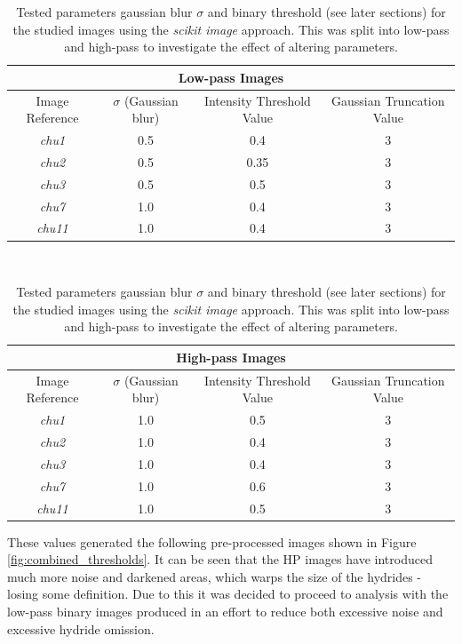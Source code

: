 \documentclass{article}
\begin{document}
	\begin{table}[ht]
	\begin{center}
	\begin{tabular}{ |c|c|c|c| } 
		\hline
		\multicolumn{4}{|c|}{Low-pass Images} \\
		\hline
		Image Reference & $\sigma$ (Gaussian blur) & Intensity Threshold Value & Gaussian Truncation Value \\
		\hline
		\textit{chu1} & 0.5 & 0.4 & 3 \\ 
		\textit{chu2} & 0.5 & 0.35 & 3 \\ 
		\textit{chu3} & 0.5 & 0.5 & 3 \\ 
		\textit{chu7} & 1.0 & 0.4 & 3 \\ 
		\textit{chu11} & 1.0 & 0.4 & 3 \\ 
		\hline
	\end{tabular}
	\\
	\begin{tabular}{ |c|c|c|c| } 
		\hline
		\multicolumn{4}{|c|}{High-pass Images} \\
		\hline
		Image Reference & $\sigma$ (Gaussian blur) & Intensity Threshold Value & Gaussian Truncation Value \\
		\hline
		\textit{chu1} & 1.0 & 0.5 & 3 \\ 
		\textit{chu2} & 1.0 & 0.4 & 3 \\ 
		\textit{chu3} & 1.0 & 0.4 & 3 \\ 
		\textit{chu7} & 1.0 & 0.6 & 3 \\ 
		\textit{chu11} & 1.0 & 0.5 & 3 \\ 
		\hline
	\end{tabular}
	\caption{Tested parameters gaussian blur $\sigma$ and binary threshold (see later sections) for the studied images using the \textit{scikit image} approach. This was split into low-pass and high-pass to investigate the effect of altering parameters.}
	\label{tab:imageprocessing}
	\end{center}
	\end{table}
	
    \noindent These values generated the following pre-processed images shown in Figure \ref{fig:combined_thresholds}. It can be seen that the HP images have introduced much more noise and darkened areas, which warps the size of the hydrides - losing some definition. Due to this it was decided to proceed to analysis with the low-pass binary images produced in an effort to reduce both excessive noise and excessive hydride omission.
\end{document}
